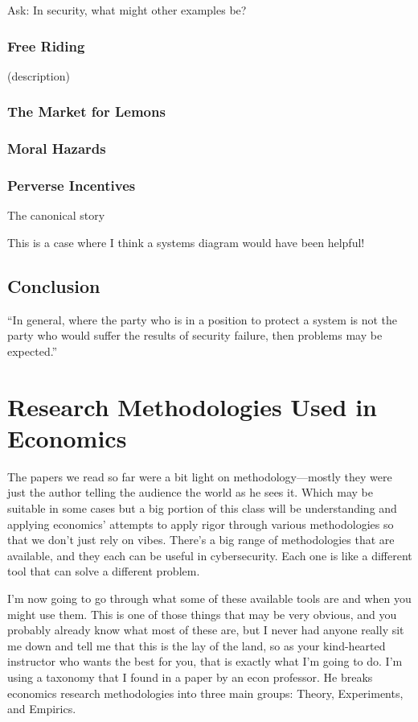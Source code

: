 \documentclass[11pt]{article}
\begin{document}
{Ask: In security, what might other examples be?}

\subsubsection{Free Riding}

(description)

\subsubsection{The Market for Lemons}

\subsubsection{Moral Hazards}

\subsubsection{Perverse Incentives}

The canonical story 

This is a case where I think a systems diagram would have been helpful! 

\subsection{Conclusion}

“In general, where the party who is in a position to protect a system is not the party who would suffer the results of security failure, then problems may be expected.”


\section{Research Methodologies Used in Economics}

The papers we read so far were a bit light on methodology---mostly they were just the author telling the audience the world as he sees it. Which may be suitable in some cases but a big portion of this class will be understanding and applying economics' attempts to apply rigor through various methodologies so that we don't just rely on vibes. 
There's a big range of methodologies that are available, and they each can be useful in cybersecurity. 
Each one is like a different tool that can solve a different problem.

I'm now going to go through what some of these available tools are and when you might use them.
This is one of those things that may be very obvious, and you probably already know what most of these are, but I never had anyone really sit me down and tell me that this is the lay of the land, so as your kind-hearted instructor who wants the best for you, that is exactly what I'm going to do. I'm using a taxonomy that I found in a paper by an econ professor. He breaks economics research methodologies into three main groups: Theory, Experiments, and Empirics.
\end{document}
